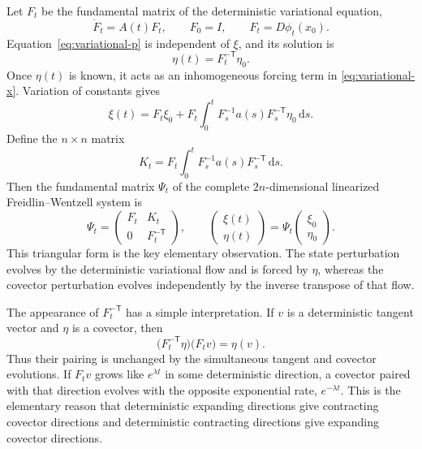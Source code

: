 \documentclass[11pt]{article}
\theoremstyle{definition}
\theoremstyle{remark}
\newcommand{\phit}{\phi_t}
\newcommand{\dd}{\mathrm{d}}
\newcommand{\cT}{\mathsf{T}}
\begin{document}
Let $F_t$ be the fundamental matrix of the deterministic variational equation,
\begin{equation}
\dot F_t=A(t)F_t,
\qquad F_0=I,
\qquad F_t=D\phit(x_0).
\label{eq:F-def}
\end{equation}
Equation~\eqref{eq:variational-p} is independent of $\xi$, and its solution is
\begin{equation}
\eta(t)=F_t^{-\cT}\eta_0.
\label{eq:eta-solution}
\end{equation}
Once $\eta(t)$ is known, it acts as an inhomogeneous forcing term in \eqref{eq:variational-x}.  Variation of constants gives
\begin{equation}
\xi(t)=F_t\xi_0+
F_t\int_0^tF_s^{-1}a(s)F_s^{-\cT}\eta_0\,\dd s.
\label{eq:xi-solution}
\end{equation}
Define the $n\times n$ matrix
\begin{equation}
K_t=
F_t\int_0^tF_s^{-1}a(s)F_s^{-\cT}\,\dd s.
\label{eq:K-def}
\end{equation}
Then the fundamental matrix $\Psi_t$ of the complete $2n$-dimensional linearized Freidlin--Wentzell system is
\begin{equation}
\Psi_t=
\begin{pmatrix}
F_t&K_t\\0&F_t^{-\cT}
\end{pmatrix},
\qquad
\begin{pmatrix}\xi(t)\\\eta(t)\end{pmatrix}
=\Psi_t\begin{pmatrix}\xi_0\\\eta_0\end{pmatrix}.
\label{eq:Psi}
\end{equation}
This triangular form is the key elementary observation.  The state perturbation evolves by the deterministic variational flow and is forced by $\eta$, whereas the covector perturbation evolves independently by the inverse transpose of that flow.

The appearance of $F_t^{-\cT}$ has a simple interpretation.  If $v$ is a deterministic tangent vector and $\eta$ is a covector, then
\begin{equation}
\bigl(F_t^{-\cT}\eta\bigr)\bigl(F_tv\bigr)=\eta(v).
\label{eq:dual-pairing}
\end{equation}
Thus their pairing is unchanged by the simultaneous tangent and covector evolutions.  If $F_tv$ grows like $e^{\lambda t}$ in some deterministic direction, a covector paired with that direction evolves with the opposite exponential rate, $e^{-\lambda t}$.  This is the elementary reason that deterministic expanding directions give contracting covector directions and deterministic contracting directions give expanding covector directions.
\end{document}
